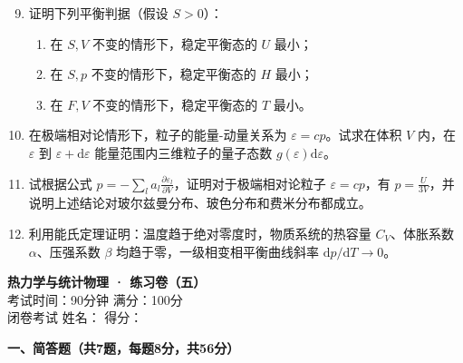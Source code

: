 \documentclass[12pt,a4paper,fontset=mac]{ctexart}
\newcommand{\dd}{\mathrm{d}}
\newcommand{\đ}{\mathrm{đ}}
\begin{document}
\begin{enumerate}
\setcounter{enumi}{8}
\item 证明下列平衡判据（假设 $S > 0$）：
\begin{enumerate}
\item 在 $S, V$ 不变的情形下，稳定平衡态的 $U$ 最小；
\item 在 $S, p$ 不变的情形下，稳定平衡态的 $H$ 最小；
\item 在 $F, V$ 不变的情形下，稳定平衡态的 $T$ 最小。
\end{enumerate}

\item 在极端相对论情形下，粒子的能量-动量关系为 $\varepsilon = cp$。试求在体积 $V$ 内，在 $\varepsilon$ 到 $\varepsilon + \dd\varepsilon$ 能量范围内三维粒子的量子态数 $g(\varepsilon)\dd\varepsilon$。

\item 试根据公式 $p = -\sum_l a_l \frac{\partial\varepsilon_l}{\partial V}$，证明对于极端相对论粒子 $\varepsilon = cp$，有 $p = \frac{U}{3V}$，并说明上述结论对玻尔兹曼分布、玻色分布和费米分布都成立。

\item 利用能氏定理证明：温度趋于绝对零度时，物质系统的热容量 $C_V$、体胀系数 $\alpha$、压强系数 $\beta$ 均趋于零，一级相变相平衡曲线斜率 $\dd p/\dd T \to 0$。
\end{enumerate}

\newpage

\begin{center}
{\LARGE \textbf{热力学与统计物理 · 练习卷（五）}}\\[0.5em]
{\large 考试时间：90分钟 \quad 满分：100分}\\[0.3em]
{\normalsize 闭卷考试 \quad 姓名：\underline{\hspace{3cm}} \quad 得分：\underline{\hspace{2cm}}}
\end{center}
\vspace{0.5em}

\noindent\textbf{一、简答题（共7题，每题8分，共56分）}
\end{document}

